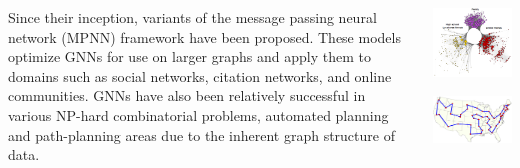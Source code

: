 \documentclass[20pt,,margin=1in,innermargin=-4.5in,blockverticalspace=-0.25in]{tikzposter}
\begin{document}
\begin{columns}
{		\par Since their inception, variants of the message passing neural network (MPNN) framework have been proposed. These models optimize
		GNNs for use on larger graphs and apply them to domains such as social networks, citation networks, and online communities. GNNs have
		also been relatively successful in various NP-hard combinatorial problems, automated planning and path-planning areas due to the
		inherent graph structure of data.
		\begin{center}
			\begin{minipage}{0.45\linewidth}
				\centering
				\begin{tikzfigure}
					\includegraphics[width=13.6cm]{Figures/GNN_APP.png}
				\end{tikzfigure}%
			\end{minipage}\hfill
			\begin{minipage}{0.55\linewidth}
				\centering
				\begin{tikzfigure}
					\includegraphics[width=14cm]{Figures/TSP.png}
				\end{tikzfigure}%
			\end{minipage}
		\end{center}
	}


\end{columns}
\end{document}
